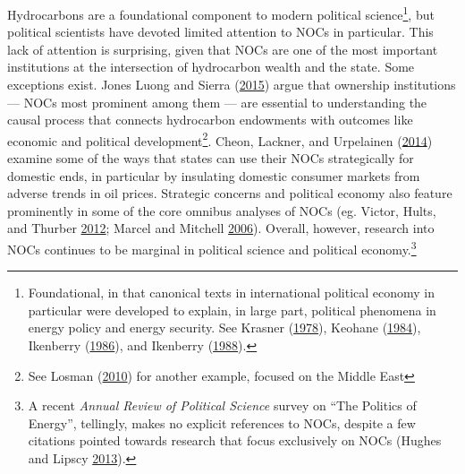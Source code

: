 \documentclass[11pt,]{book}
\begin{document}
Hydrocarbons are a foundational component to modern political science\footnote{Foundational, in that canonical texts in international political economy in particular were developed to explain, in large part, political phenomena in energy policy and energy security. See Krasner (\protect\hyperlink{ref-krasner_defending_1978}{1978}), Keohane (\protect\hyperlink{ref-keohane_after_1984}{1984}), Ikenberry (\protect\hyperlink{ref-ikenberry_irony_1986}{1986}), and Ikenberry (\protect\hyperlink{ref-ikenberry_reasons_1988}{1988}).}, but political scientists have devoted limited attention to NOCs in particular. This lack of attention is surprising, given that NOCs are one of the most important institutions at the intersection of hydrocarbon wealth and the state. Some exceptions exist. Jones Luong and Sierra (\protect\hyperlink{ref-jones_luong_domestic_2015}{2015}) argue that ownership institutions --- NOCs most prominent among them --- are essential to understanding the causal process that connects hydrocarbon endowments with outcomes like economic and political development\footnote{See Losman (\protect\hyperlink{ref-losman_rentier_2010}{2010}) for another example, focused on the Middle East}. Cheon, Lackner, and Urpelainen (\protect\hyperlink{ref-cheon_instruments_2014}{2014}) examine some of the ways that states can use their NOCs strategically for domestic ends, in particular by insulating domestic consumer markets from adverse trends in oil prices. Strategic concerns and political economy also feature prominently in some of the core omnibus analyses of NOCs (eg. Victor, Hults, and Thurber \protect\hyperlink{ref-victor_oil_2012}{2012}; Marcel and Mitchell \protect\hyperlink{ref-marcel_oil_2006}{2006}). Overall, however, research into NOCs continues to be marginal in political science and political economy.\footnote{A recent \emph{Annual Review of Political Science} survey on ``The Politics of Energy'', tellingly, makes no explicit references to NOCs, despite a few citations pointed towards research that focus exclusively on NOCs (Hughes and Lipscy \protect\hyperlink{ref-hughes_politics_2013}{2013}).}
\end{document}

